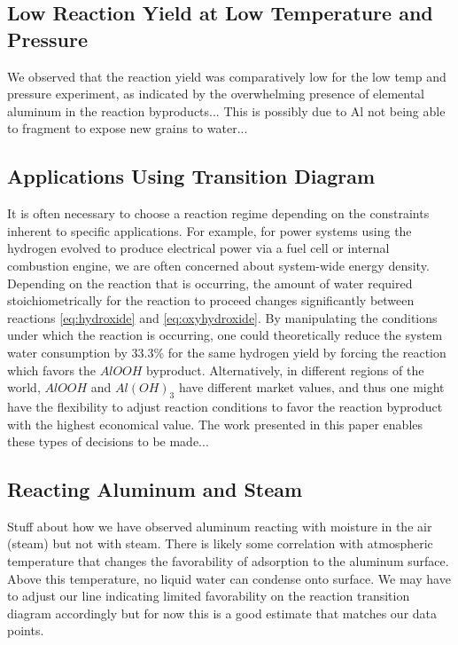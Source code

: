 \documentclass[preprint,12pt,3p]{elsarticle}
\begin{document}
\subsection{Low Reaction Yield at Low Temperature and Pressure}

We observed that the reaction yield was comparatively low for the low temp and
pressure experiment, as indicated by the overwhelming presence of elemental
aluminum in the reaction byproducts... This is possibly due to Al not being able
to fragment to expose new grains to water...
 
\subsection{Applications Using Transition Diagram}

It is often necessary to choose a reaction regime depending on the constraints
inherent to specific applications. For example, for power systems using the
hydrogen evolved to produce electrical power via a fuel cell or internal
combustion engine, we are often concerned about system-wide energy density.
Depending on the reaction that is occurring, the amount of water required
stoichiometrically for the reaction to proceed changes significantly between
reactions \ref{eq:hydroxide} and \ref{eq:oxyhydroxide}. By manipulating the
conditions under which the reaction is occurring, one could theoretically reduce
the system water consumption by 33.3\% for the same hydrogen yield by forcing
the reaction which favors the $AlOOH$ byproduct. Alternatively, in different
regions of the world, $AlOOH$ and $Al(OH)_3$ have different market values, and
thus one might have the flexibility to adjust reaction conditions to favor the
reaction byproduct with the highest economical value. The work presented in this
paper enables these types of decisions to be made...

\subsection{Reacting Aluminum and Steam} Stuff about how we have observed
aluminum reacting with moisture in the air (steam) but not with steam. There is
likely some correlation with atmospheric temperature that changes the
favorability of adsorption to the aluminum surface. Above this temperature, no
liquid water can condense onto surface. We may have to adjust our line
indicating limited favorability on the reaction transition diagram accordingly
but for now this is a good estimate that matches our data points.
\end{document}
